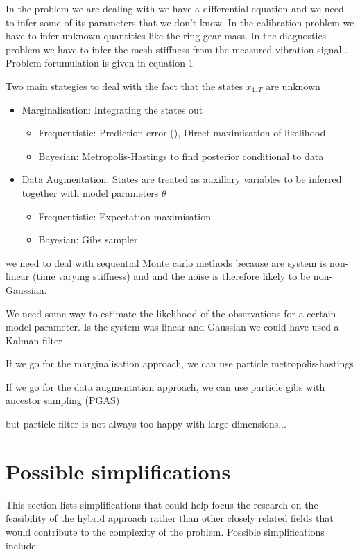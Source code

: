 In the problem we are dealing with we have a differential equation and we need to infer some of its parameters that we don't know. In the calibration problem we have to infer unknown quantities like the ring gear mass. In the diagnostics problem we have to infer the mesh stiffness from the measured vibration signal
\cite{Schon2015}. Problem forumulation is given in equation 1

Two main stategies to deal with the fact that the states $x_{1:T}$ are unknown

\begin{itemize}
	\item Marginalisation: Integrating the states out
	 \begin{itemize}
		\item Frequentistic: Prediction error (), Direct maximisation of likelihood
		\item Bayesian: Metropolis-Hastings to find posterior conditional to data
	\end{itemize}

	\item Data Augmentation: States are treated as auxillary variables to be inferred together with model parameters $\theta$
	\begin{itemize}
		\item Frequentistic: Expectation maximisation
		\item Bayesian: Gibs sampler
	\end{itemize}
\end{itemize}

we need to deal with sequential Monte carlo methods because are system is non-linear (time varying stiffness) and and the noise is therefore likely to be non-Gaussian. 

We need some way to estimate the likelihood of the observations for a certain model parameter. Is the system was linear and Gaussian we could have used a Kalman filter 

If we go for the marginalisation approach, we can use particle metropolis-hastings 

If we go for the data augmentation approach, we can use particle gibs with ancestor sampling (PGAS)

but particle filter is not always too happy with large dimensions...


\section{Possible simplifications}
This section lists simplifications that could help focus the research on the feasibility of the hybrid approach rather than other closely related fields that would contribute to the complexity of the problem. Possible simplifications include:

